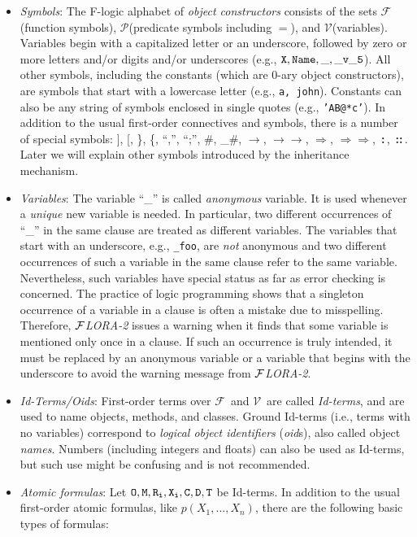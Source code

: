 \documentclass[11pt]{article}
\newcommand{\isa}{\,{\bf{:}}\,}
\newcommand{\subcl}{\,{\bf{::}}\,}
\newcommand{\fd}{\ensuremath{{\rightarrow}}}                   %
\newcommand{\mvd}{\ensuremath{{\rightarrow\!\!\!\!\rightarrow}}}  %
\newcommand{\Fd}{\ensuremath{{\Rightarrow}}}                      %
\newcommand{\Mvd}{\ensuremath{{\Rightarrow\!\!\!\!\Rightarrow}}}  %
\newcommand{\FLORA}{{\mbox{${\cal F}${\small\it LORA}\rm\emph{-2}}}\xspace}
\newcommand{\fl}{\mbox{F-logic}\xspace}
\newcommand{\funcs}{\ensuremath{\mathcal{F}}}
\newcommand{\preds}{\ensuremath{\mathcal{P}}}
\newcommand{\vars}{\ensuremath{\mathcal{V}}}
\begin{document}
\begin{itemize}
\item \emph{Symbols}: The \fl alphabet of \emph{object constructors}
  consists of the sets \funcs (function symbols), \preds (predicate symbols
  including $=$), and \vars (variables).  Variables begin with a
  capitalized letter or an underscore, followed by zero or more letters
  and/or digits and/or underscores (e.g., $\tt X, Name, \_, \_v\_5$).
  All other symbols, including the constants (which are 0-ary object
  constructors), are symbols that start with a lowercase letter (e.g., {\tt a,
  john}). Constants can also be any string of symbols enclosed in single
  quotes (e.g., {\tt 'AB@*c'}). 
  In addition to the usual first-order connectives and symbols, there is a
  number of special symbols:
  ], [, \}, \{, ``,'', ``;'', \#, \_\#, \fd, \mvd, \Fd,
  \Mvd, \isa, \subcl. Later we will explain other symbols introduced by
  the inheritance mechanism.
  
\item \emph{Variables}: The variable ``\_'' is called \emph{anonymous}
  variable. It is used whenever a \emph{unique} new variable is needed.
  In particular, two different occurrences of ``\_'' in the same clause are
  treated as different variables. The variables that start with an
  underscore, e.g., {\tt \_foo}, are \emph{not} anonymous and two
  different occurrences of such a variable in the same clause refer to the
  same variable. Nevertheless, such variables have special status as far as
  error checking is concerned. The practice of logic programming shows that
  a singleton occurrence of a variable in a clause is often a mistake
  due to misspelling. Therefore, \FLORA issues a warning when
  it finds that some variable is mentioned only once in a clause. If such
  an occurrence is truly intended, it must be replaced by an anonymous
  variable or a variable that begins with the underscore to avoid the
  warning message from \FLORA.

\item \emph{Id-Terms/Oids}:
    First-order terms over \funcs\ and \vars\ are called \emph{Id-terms},
    and are used to name objects, methods, and classes.  Ground Id-terms
    (i.e., terms with no variables) correspond to \emph{logical
      object identifiers} (\emph{oid}s), also called object \emph{names}.
    Numbers (including integers and floats) can also be used as Id-terms,
    but such use might be confusing and is not recommended.
  \index{atomic formula!in \fl}
\item \emph{Atomic formulas}: Let $\tt O,M,R_{i},X_{i},C,D,T$ be Id-terms.  In
  addition to the usual first-order atomic formulas, like
  $p(X_1,\dots,X_n)$, there are the following basic types of formulas:
  \medskip


\end{itemize}
\end{document}
